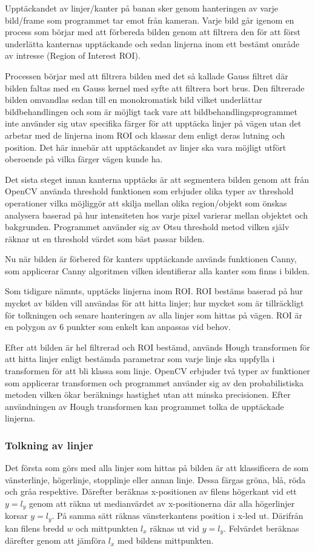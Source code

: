 \documentclass[tekniskrapport/tech.tex]{subfiles}
\begin{document}
Upptäckandet av linjer/kanter på banan sker genom hanteringen av varje
bild/frame som programmet tar emot från kameran. Varje bild går igenom en
process som börjar med att förbereda bilden genom att filtrera den för att
först underlätta kanternas upptäckande och sedan linjerna inom ett bestämt
område av intresse (Region of Interest ROI).

Processen börjar med att filtrera bilden med det så kallade Gauss filtret där
bilden faltas med en Gauss kernel med syfte att filtrera bort brus. Den
filtrerade bilden omvandlas sedan till en monokromatisk bild vilket underlättar
bildbehandlingen och som är möjligt tack vare att bildbehandlingsprogrammet
inte använder sig utav specifika färger för att upptäcka linjer på vägen utan
det arbetar med de linjerna inom ROI och klassar dem enligt deras lutning och
position. Det här innebär att upptäckandet av linjer ska vara möjligt utfört
oberoende på vilka färger vägen kunde ha. 

Det sista steget innan kanterna upptäcks är att segmentera bilden genom att
från OpenCV använda threshold funktionen som erbjuder olika typer av threshold
operationer vilka möjliggör att skilja mellan olika region/objekt som önskas
analysera baserad på hur intensiteten hos varje pixel varierar mellan objektet
och bakgrunden. Programmet använder sig av Otsu threshold metod vilken själv
räknar ut en threshold värdet som bäst passar bilden.

Nu när bilden är förbered för kanters upptäckande används funktionen Canny, som
applicerar Canny algoritmen vilken identifierar alla kanter som finns i bilden.

Som tidigare nämnts, upptäcks linjerna inom ROI. ROI bestäms baserad på hur
mycket av bilden vill användas för att hitta linjer; hur mycket som är
tillräckligt för tolkningen och senare hanteringen av alla linjer som hittas på
vägen. ROI är en polygon av 6 punkter som enkelt kan anpassas vid behov.

Efter att bilden är hel filtrerad och ROI bestämd, används Hough transformen
för att hitta linjer enligt bestämda parametrar som varje linje ska uppfylla i
transformen för att bli klassa som linje. OpenCV erbjuder två typer av
funktioner som applicerar transformen och programmet använder sig av den
probabilistiska metoden vilken ökar beräknings hastighet utan att minska
precisionen. Efter användningen av Hough transformen kan programmet tolka de
upptäckade linjerna.

\subsubsection{Tolkning av linjer}
Det första som görs med alla linjer som hittas på bilden är att klassificera de
som vänsterlinje, högerlinje, stopplinje eller annan linje. Dessa färgas gröna,
blå, röda och gråa respektive. Därefter beräknas x-positionen av filens
högerkant vid ett $y=l_y$ genom att räkna ut medianvärdet av x-positionerna där
alla högerlinjer korsar $y=l_y$. På samma sätt räknas vänsterkantens position i
x-led ut. Därifrån kan filens bredd $w$ och mittpunkten $l_x$ räknas ut vid
$y=l_y$. Felvärdet beräknas därefter genom att jämföra $l_x$ med bildens
mittpunkten.
\end{document}
